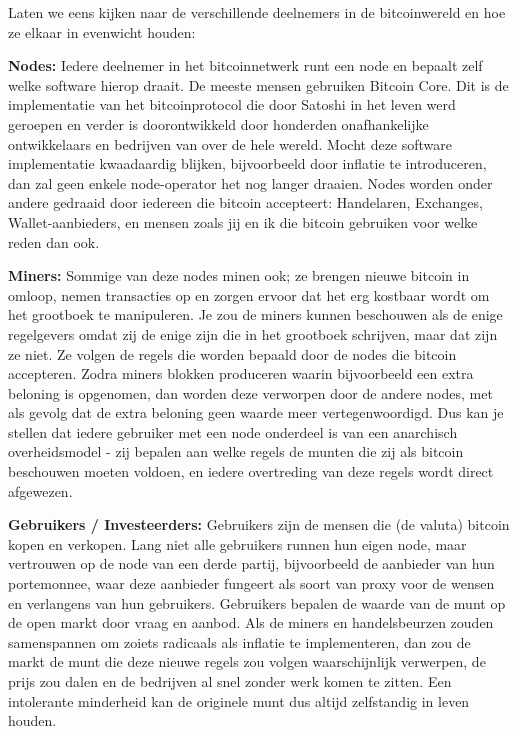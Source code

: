 \documentclass[
  letterpaper,
]{scrbook}
\begin{document}
Laten we eens kijken naar de verschillende deelnemers in de
bitcoinwereld en hoe ze elkaar in evenwicht houden:

\textbf{Nodes:} Iedere deelnemer in het bitcoinnetwerk runt een node en
bepaalt zelf welke software hierop draait. De meeste mensen gebruiken
Bitcoin Core. Dit is de implementatie van het bitcoinprotocol die door
Satoshi in het leven werd geroepen en verder is doorontwikkeld door
honderden onafhankelijke ontwikkelaars en bedrijven van over de hele
wereld. Mocht deze software implementatie kwaadaardig blijken,
bijvoorbeeld door inflatie te introduceren, dan zal geen enkele
node-operator het nog langer draaien. Nodes worden onder andere gedraaid
door iedereen die bitcoin accepteert: Handelaren, Exchanges,
Wallet-aanbieders, en mensen zoals jij en ik die bitcoin gebruiken voor
welke reden dan ook.

\textbf{Miners:} Sommige van deze nodes minen ook; ze brengen nieuwe
bitcoin in omloop, nemen transacties op en zorgen ervoor dat het erg
kostbaar wordt om het grootboek te manipuleren. Je zou de miners kunnen
beschouwen als de enige regelgevers omdat zij de enige zijn die in het
grootboek schrijven, maar dat zijn ze niet. Ze volgen de regels die
worden bepaald door de nodes die bitcoin accepteren. Zodra miners
blokken produceren waarin bijvoorbeeld een extra beloning is opgenomen,
dan worden deze verworpen door de andere nodes, met als gevolg dat de
extra beloning geen waarde meer vertegenwoordigd. Dus kan je stellen dat
iedere gebruiker met een node onderdeel is van een anarchisch
overheidsmodel - zij bepalen aan welke regels de munten die zij als
bitcoin beschouwen moeten voldoen, en iedere overtreding van deze regels
wordt direct afgewezen.

\textbf{Gebruikers / Investeerders:} Gebruikers zijn de mensen die (de
valuta) bitcoin kopen en verkopen. Lang niet alle gebruikers runnen hun
eigen node, maar vertrouwen op de node van een derde partij,
bijvoorbeeld de aanbieder van hun portemonnee, waar deze aanbieder
fungeert als soort van proxy voor de wensen en verlangens van hun
gebruikers. Gebruikers bepalen de waarde van de munt op de open markt
door vraag en aanbod. Als de miners en handelsbeurzen zouden
samenspannen om zoiets radicaals als inflatie te implementeren, dan zou
de markt de munt die deze nieuwe regels zou volgen waarschijnlijk
verwerpen, de prijs zou dalen en de bedrijven al snel zonder werk komen
te zitten. Een intolerante minderheid kan de originele munt dus altijd
zelfstandig in leven houden.
\end{document}
